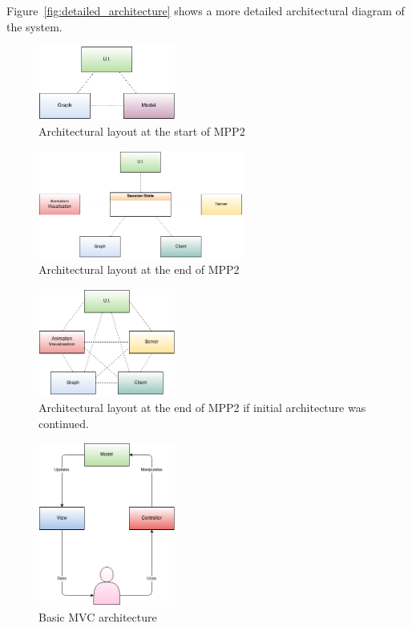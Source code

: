 Figure~\ref{fig:detailed_architecture} shows a more detailed architectural diagram of the system.



\begin{figure}[h!]
    \centering
    \includegraphics[width=0.4\textwidth]{images/initial_architecture.png}
    \caption{Architectural layout at the start of MPP2}
    \label{fig:initial_architecture}
\end{figure}

\begin{figure}[h!]
    \centering
    \includegraphics[width=0.6\textwidth]{images/final_architecture.png}
    \caption{Architectural layout at the end of MPP2}
    \label{fig:final_architecture}
\end{figure}

\begin{figure}[h!]
    \centering
    \includegraphics[width=0.4\textwidth]{images/initial_architecture_future.png}
    \caption{Architectural layout at the end of MPP2 if initial architecture was continued.}
    \label{fig:initial_architecture_future}
\end{figure}


\begin{figure}[h!]
    \centering
    \includegraphics[width=0.4\textwidth]{images/mvc.png}
    \caption{Basic \ac{MVC} architecture}
    \label{fig:mvc}
\end{figure}

